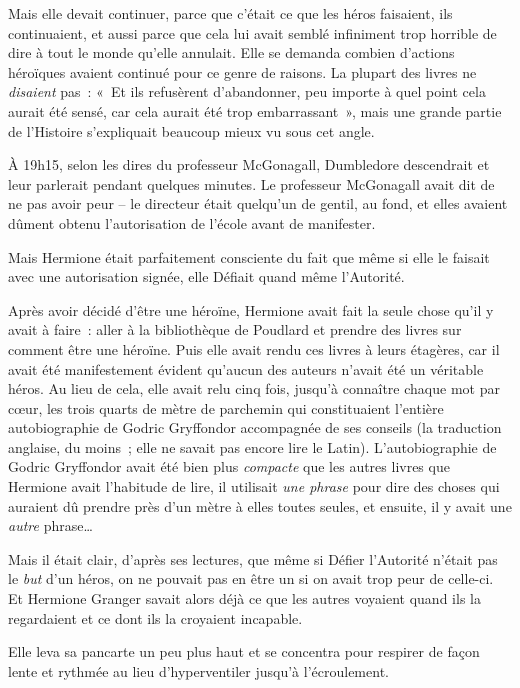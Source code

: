 Mais elle devait continuer, parce que c'était ce que les héros faisaient, ils continuaient, et aussi parce que cela lui avait semblé infiniment trop horrible de dire à tout le monde qu'elle annulait. Elle se demanda combien d'actions héroïques avaient continué pour ce genre de raisons. La plupart des livres ne \emph{disaient} pas~: «~Et ils refusèrent d'abandonner, peu importe à quel point cela aurait été sensé, car cela aurait été trop embarrassant~», mais une grande partie de l'Histoire s'expliquait beaucoup mieux vu sous cet angle.

À 19h15, selon les dires du professeur McGonagall, Dumbledore descendrait et leur parlerait pendant quelques minutes. Le professeur McGonagall avait dit de ne pas avoir peur -- le directeur était quelqu'un de gentil, au fond, et elles avaient dûment obtenu l'autorisation de l'école avant de manifester.

Mais Hermione était parfaitement consciente du fait que même si elle le faisait avec une autorisation signée, elle Défiait quand même l'Autorité.

Après avoir décidé d'être une héroïne, Hermione avait fait la seule chose qu'il y avait à faire~: aller à la bibliothèque de Poudlard et prendre des livres sur comment être une héroïne. Puis elle avait rendu ces livres à leurs étagères, car il avait été manifestement évident qu'aucun des auteurs n'avait été un véritable héros. Au lieu de cela, elle avait relu cinq fois, jusqu'à connaître chaque mot par cœur, les trois quarts de mètre de parchemin qui constituaient l'entière autobiographie de Godric Gryffondor accompagnée de ses conseils (la traduction anglaise, du moins~; elle ne savait pas encore lire le Latin). L'autobiographie de Godric Gryffondor avait été bien plus \emph{compacte} que les autres livres que Hermione avait l'habitude de lire, il utilisait \emph{une phrase} pour dire des choses qui auraient dû prendre près d'un mètre à elles toutes seules, et ensuite, il y avait une \emph{autre} phrase…

Mais il était clair, d'après ses lectures, que même si Défier l'Autorité n'était pas le \emph{but} d'un héros, on ne pouvait pas en être un si on avait trop peur de celle-ci. Et Hermione Granger savait alors déjà ce que les autres voyaient quand ils la regardaient et ce dont ils la croyaient incapable.

Elle leva sa pancarte un peu plus haut et se concentra pour respirer de façon lente et rythmée au lieu d'hyperventiler jusqu'à l'écroulement.

